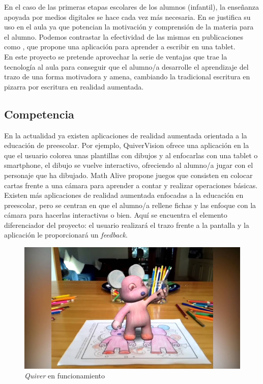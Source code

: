 \documentclass[12pt,spanish]{article}
\begin{document}
En el caso de las primeras etapas escolares de los alumnos (infantil), la enseñanza apoyada por medios digitales se hace cada vez más necesaria. En \cite{Robles-Melendez} se justifica su uso en el aula ya que potencian la motivación y comprensión de la materia para el alumno. Podemos contrastar la efectividad de las mismas en publicaciones como \cite{Bonneton-Botte2020}, que propone una aplicación para aprender a escribir en una tablet.\\

En este proyecto se pretende aprovechar la serie de ventajas que trae la tecnología al aula para conseguir que el alumno/a desarrolle el aprendizaje del trazo de una forma motivadora y amena, cambiando la tradicional escritura en pizarra por escritura en realidad aumentada.

\subsection{Competencia}

En la actualidad ya existen aplicaciones de realidad aumentada orientada a la educación de preescolar. Por ejemplo, QuiverVision \cite{quiver} ofrece una aplicación en la que el usuario colorea unas plantillas con dibujos y al enfocarlas con una tablet o smartphone, el dibujo se vuelve interactivo, ofreciendo al alumno/a jugar con el personaje que ha dibujado. Math Alive \cite{MathAlive} propone juegos que consisten en colocar cartas frente a una cámara para aprender a contar y realizar operaciones básicas.\\

Existen más aplicaciones de realidad aumentada enfocadas a la educación en preescolar, pero se centran en que el alumno/a rellene fichas y las enfoque con la cámara para hacerlas interactivas o bien. Aquí se encuentra el elemento diferenciador del proyecto: el usuario realizará el trazo frente a la pantalla y la aplicación le proporcionará un \emph{feedback}.

\begin{figure}[H]
	\centering
	\includegraphics[scale=0.2]{quiver.jpg}
	\caption{\emph{Quiver} en funcionamiento}
\end{figure}
\end{document}
